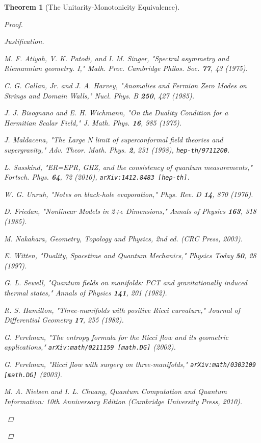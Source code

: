 \documentclass[11pt, letterpaper]{report}
\theoremstyle{plain} %
\newtheorem{theorem}{Theorem}[chapter]
\theoremstyle{definition} %
\theoremstyle{remark} %
\begin{document}
\begin{theorem}[The Unitarity-Monotonicity Equivalence]
\begin{proof}
\begin{proof}[Justification]
\begin{thebibliography}{99}
M. F. Atiyah, V. K. Patodi, and I. M. Singer, "Spectral asymmetry and Riemannian geometry. I," \textit{Math. Proc. Cambridge Philos. Soc.} \textbf{77}, 43 (1975).

C. G. Callan, Jr. and J. A. Harvey, "Anomalies and Fermion Zero Modes on Strings and Domain Walls," \textit{Nucl. Phys. B} \textbf{250}, 427 (1985).

J. J. Bisognano and E. H. Wichmann, "On the Duality Condition for a Hermitian Scalar Field," \textit{J. Math. Phys.} \textbf{16}, 985 (1975).

J. Maldacena, "The Large N limit of superconformal field theories and supergravity," \textit{Adv. Theor. Math. Phys.} \textbf{2}, 231 (1998), \texttt{hep-th/9711200}.

L. Susskind, "ER=EPR, GHZ, and the consistency of quantum measurements," \textit{Fortsch. Phys.} \textbf{64}, 72 (2016), \texttt{arXiv:1412.8483 [hep-th]}.

W. G. Unruh, "Notes on black-hole evaporation," \textit{Phys. Rev. D} \textbf{14}, 870 (1976).

D. Friedan, "Nonlinear Models in 2+$\epsilon$ Dimensions," \textit{Annals of Physics} \textbf{163}, 318 (1985).

M. Nakahara, \textit{Geometry, Topology and Physics}, 2nd ed. (CRC Press, 2003).

E. Witten, "Duality, Spacetime and Quantum Mechanics," \textit{Physics Today} \textbf{50}, 28 (1997).

G. L. Sewell, "Quantum fields on manifolds: PCT and gravitationally induced thermal states," \textit{Annals of Physics} \textbf{141}, 201 (1982).

R. S. Hamilton, "Three-manifolds with positive Ricci curvature," \textit{Journal of Differential Geometry} \textbf{17}, 255 (1982).

G. Perelman, "The entropy formula for the Ricci flow and its geometric applications," \texttt{arXiv:math/0211159 [math.DG]} (2002).

G. Perelman, "Ricci flow with surgery on three-manifolds," \texttt{arXiv:math/0303109 [math.DG]} (2003).

M. A. Nielsen and I. L. Chuang, \textit{Quantum Computation and Quantum Information: 10th Anniversary Edition} (Cambridge University Press, 2010).


\end{thebibliography}
\end{proof}
\end{proof}
\end{theorem}
\end{document}
